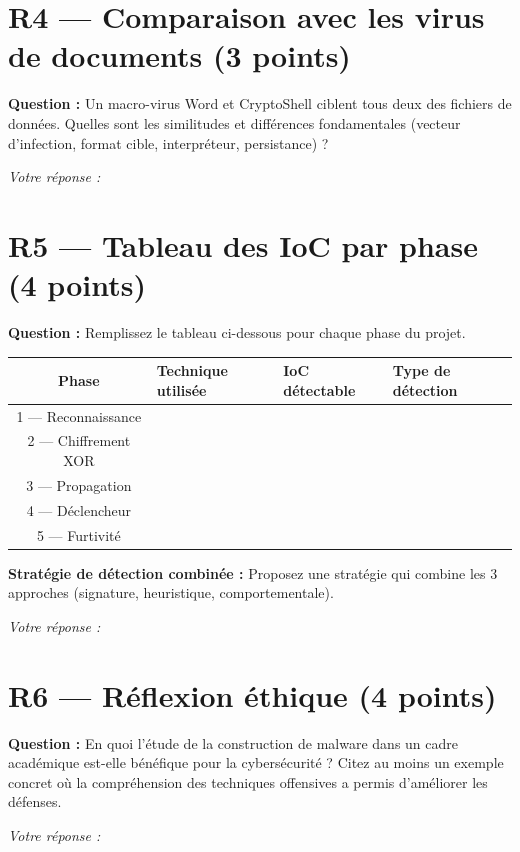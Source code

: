 \documentclass[a4paper,11pt]{article}
\begin{document}
\section*{R4 --- Comparaison avec les virus de documents (3 points)}

\textbf{Question :} Un macro-virus Word et CryptoShell ciblent tous deux des fichiers de donn\'ees. Quelles sont les similitudes et diff\'erences fondamentales (vecteur d'infection, format cible, interpr\'eteur, persistance) ?

\bigskip
\noindent\textit{Votre r\'eponse :}
\vspace{5cm}

\section*{R5 --- Tableau des IoC par phase (4 points)}

\textbf{Question :} Remplissez le tableau ci-dessous pour chaque phase du projet.

\bigskip
\begin{center}
\begin{tabular}{|c|p{3.5cm}|p{4cm}|p{3.5cm}|}
\hline
\textbf{Phase} & \textbf{Technique utilis\'ee} & \textbf{IoC d\'etectable} & \textbf{Type de d\'etection} \\
\hline
1 --- Reconnaissance & & & \\[1.5em]
\hline
2 --- Chiffrement XOR & & & \\[1.5em]
\hline
3 --- Propagation & & & \\[1.5em]
\hline
4 --- D\'eclencheur & & & \\[1.5em]
\hline
5 --- Furtivit\'e & & & \\[1.5em]
\hline
\end{tabular}
\end{center}

\bigskip
\noindent\textbf{Strat\'egie de d\'etection combin\'ee :} Proposez une strat\'egie qui combine les 3 approches (signature, heuristique, comportementale).

\bigskip
\noindent\textit{Votre r\'eponse :}
\vspace{4cm}

\section*{R6 --- R\'eflexion \'ethique (4 points)}

\textbf{Question :} En quoi l'\'etude de la construction de malware dans un cadre acad\'emique est-elle b\'en\'efique pour la cybers\'ecurit\'e ? Citez au moins un exemple concret o\`u la compr\'ehension des techniques offensives a permis d'am\'eliorer les d\'efenses.

\bigskip
\noindent\textit{Votre r\'eponse :}
\vspace{5cm}
\end{document}
